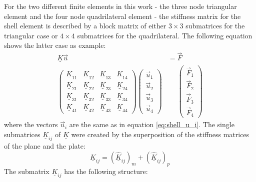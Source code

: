  For the two different finite elements in this work - the three node triangular element and the four node quadrilateral element - the stiffness matrix for the shell element is described by a block matrix of either $3\!\times\!3$ submatrices for the triangular case or $4\!\times\!4$ submatrices for the quadrilateral. The following equation shows the latter case as example:
 \begin{align}\label{eq:shell_K_ij}
 \underline{K} \vec{u} &= \vec{F} \nonumber\\
 \begin{pmatrix}
 \underline{K}_{11} & \underline{K}_{12} & \underline{K}_{13} & \underline{K}_{14}\\
 \underline{K}_{21} & \underline{K}_{22} & \underline{K}_{23} & \underline{K}_{24}\\
 \underline{K}_{31} & \underline{K}_{32} & \underline{K}_{33} & \underline{K}_{34}\\
 \underline{K}_{41} & \underline{K}_{42} & \underline{K}_{43} & \underline{K}_{44}
 \end{pmatrix} \begin{pmatrix}
 \vec{u}_1 \\\vec{u}_2 \\\vec{u}_3\\\vec{u}_4
 \end{pmatrix} &= \begin{pmatrix}
 \vec{F}_1\\\vec{F}_2\\\vec{F}_3\\\vec{F}_4
 \end{pmatrix}
 \end{align}
 where the vectors $\vec{u}_i$ are the same as in equation \eqref{eq:shell_u_i}. The single submatrices $\underline{K}_{ij}$ of $\underline{K}$ were created by the superposition of the stiffness matrices of the plane and the plate:
 \begin{equation}
 \underline{K}_{ij} = \left(\underline{\hat{K}}_{ij}\right)_m + \left(\underline{\hat{K}}_{ij}\right)_p
 \end{equation}
 The submatrix $\underline{K}_{ij}$ has the following structure:
